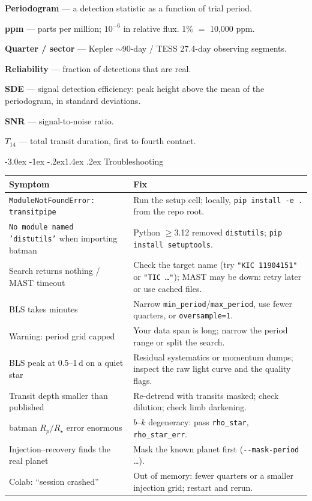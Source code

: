 \documentclass[11pt,a4paper]{article}
\makeatletter
\renewcommand\section{\@startsection{section}{1}{\z@}%
  {-3.0ex \@plus -1ex \@minus -.2ex}{1.4ex \@plus .2ex}%
  {\normalfont\sffamily\LARGE\bfseries\color{navy}}}
\makeatother
\begin{document}
\begin{multicols}{2}
\textbf{Periodogram} --- a detection statistic as a function of trial period.

\textbf{ppm} --- parts per million; \(10^{-6}\) in relative flux. 1\% \(=\) 10{,}000 ppm.

\textbf{Quarter / sector} --- Kepler \(\sim\)90-day / TESS 27.4-day observing segments.

\textbf{Reliability} --- fraction of detections that are real.

\textbf{SDE} --- signal detection efficiency: peak height above the mean of the periodogram, in standard deviations.

\textbf{SNR} --- signal-to-noise ratio.

\textbf{\(T_{14}\)} --- total transit duration, first to fourth contact.
\end{multicols}

\appendix
\section{Troubleshooting}
\label{app:faq}
\begin{center}
\small
\begin{tabularx}{\linewidth}{@{}L{5.4cm} Y@{}}
\toprule
\textbf{Symptom} & \textbf{Fix}\\
\midrule
\texttt{ModuleNotFoundError: transitpipe} & Run the setup cell; locally, \texttt{pip install -e .} from the repo root.\\
\texttt{No module named 'distutils'} when importing batman & Python \(\ge\)3.12 removed \texttt{distutils}; \texttt{pip install setuptools}.\\
Search returns nothing / MAST timeout & Check the target name (try \texttt{"KIC 11904151"} or \texttt{"TIC \ldots"}); MAST may be down: retry later or use cached files.\\
BLS takes minutes & Narrow \texttt{min\_period}/\texttt{max\_period}, use fewer quarters, or \texttt{oversample=1}.\\
Warning: period grid capped & Your data span is long; narrow the period range or split the search.\\
BLS peak at 0.5--1\,d on a quiet star & Residual systematics or momentum dumps; inspect the raw light curve and the quality flags.\\
Transit depth smaller than published & Re-detrend with transits masked; check dilution; check limb darkening.\\
batman \(R_p/R_\star\) error enormous & \(b\)--\(k\) degeneracy: pass \texttt{rho\_star}, \texttt{rho\_star\_err}.\\
Injection--recovery finds the real planet & Mask the known planet first (\texttt{-{}-mask-period} \ldots).\\
Colab: ``session crashed'' & Out of memory: fewer quarters or a smaller injection grid; restart and rerun.\\
\bottomrule
\end{tabularx}
\end{center}
\end{document}

